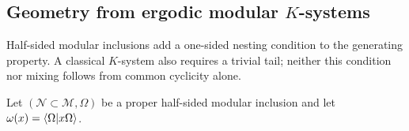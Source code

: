 \documentclass[a4paper,11pt]{article}
\theoremstyle{definition}
\begin{document}


\subsection{Geometry from ergodic modular \texorpdfstring{$K$}{K}-systems}\label{subsec:geometry-modular-ergodic}


Half-sided modular inclusions add a one-sided nesting condition to the generating
property. A classical $K$-system also requires a trivial tail; neither this condition
nor mixing follows from common cyclicity alone.

Let $(\mathcal N\subset\mathcal M,\Omega)$ be a proper half-sided modular
inclusion and let $\omega(x)=\braket{\Omega|x\Omega}$.
\end{document}
